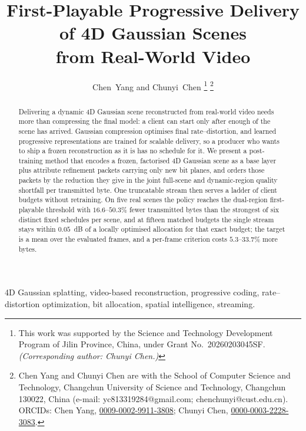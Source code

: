 \documentclass[lettersize,journal]{IEEEtran}
\begin{document}
\title{First-Playable Progressive Delivery of 4D Gaussian Scenes\\from Real-World Video}

\author{Chen~Yang and Chunyi~Chen%
\thanks{This work was supported by the Science and Technology Development
Program of Jilin Province, China, under Grant No.~20260203045SF.
\emph{(Corresponding author: Chunyi Chen.)}}%
\thanks{Chen Yang and Chunyi Chen are with the School of Computer Science and
Technology, Changchun University of Science and Technology, Changchun 130022,
China (e-mail: yc813319284@gmail.com; chenchunyi@cust.edu.cn). ORCIDs: Chen
Yang, \href{https://orcid.org/0009-0002-9911-3808}{0009-0002-9911-3808};
Chunyi Chen, \href{https://orcid.org/0000-0003-2228-3083}{0000-0003-2228-3083}.}}

\maketitle

\begin{abstract}
Delivering a dynamic 4D Gaussian scene reconstructed from real-world video needs
more than compressing the final model: a client can start only after enough of
the scene has arrived. Gaussian compression optimises final rate--distortion, and
learned progressive representations are trained for scalable delivery, so a
producer who wants to ship a frozen reconstruction as it is has no schedule for
it. We present a post-training method that encodes a frozen, factorised 4D
Gaussian scene as a base layer plus attribute refinement packets carrying only
new bit planes, and orders those packets by the reduction they give in the joint
full-scene and dynamic-region quality shortfall per transmitted byte. One
truncatable stream then serves a ladder of client budgets without retraining.
On five real scenes the policy reaches the dual-region first-playable threshold
with $16.6$--$50.3\%$ fewer transmitted bytes than the strongest of six distinct fixed
schedules per scene, and at fifteen matched budgets the single stream stays within $0.05$~dB of a
locally optimised allocation for that exact budget; the target is a mean over the
evaluated frames, and a per-frame criterion costs $5.3$--$33.7\%$ more bytes.
\end{abstract}

\begin{IEEEkeywords}
4D Gaussian splatting, video-based reconstruction, progressive coding,
rate--distortion optimization, bit allocation, spatial intelligence, streaming.
\end{IEEEkeywords}
\end{document}
